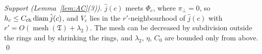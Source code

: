 \emph{Support (Lemma~\ref{lem:AC}(3)).} $\hat j(c)$ meets $\Phi_c$, where $\pi_\perp=0$, so $h_c\le C_{\rm ch}\operatorname{diam}\hat j(c)$, and $V_c$ lies in the $r'$-neighbourhood of $\hat j(c)$ with $r'=O(\operatorname{mesh}(\mathfrak T)+\lambda_2)$. The mesh can be decreased by subdivision outside the rings and by shrinking the rings, and $\lambda_2$, $\eta$, $C_0$ are bounded only from above. \qed
